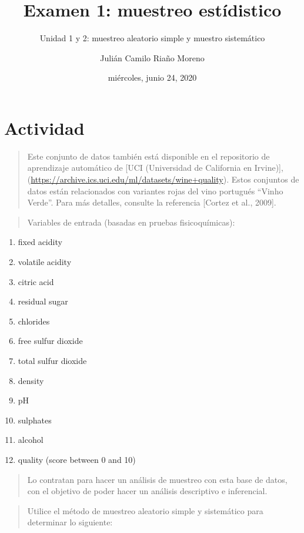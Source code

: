 \documentclass[
]{article}
\title{Examen 1: muestreo estídistico}
\subtitle{Unidad 1 y 2: muestreo aleatorio simple y muestro sistemático}
\author{Julián Camilo Riaño Moreno}
\date{miércoles, junio 24, 2020}
\providecommand{\tightlist}{%
  \setlength{\itemsep}{0pt}\setlength{\parskip}{0pt}}
\begin{document}
\maketitle

{
\setcounter{tocdepth}{3}
\tableofcontents
}
\hypertarget{actividad}{%
\section{Actividad}\label{actividad}}

\begin{quote}
Este conjunto de datos también está disponible en el repositorio de
aprendizaje automático de {[}UCI (Universidad de California en
Irvine){]},
(\url{https://archive.ics.uci.edu/ml/datasets/wine+quality}). Estos
conjuntos de datos están relacionados con variantes rojas del vino
portugués ``Vinho Verde''. Para más detalles, consulte la referencia
{[}Cortez et al., 2009{]}.
\end{quote}

\begin{quote}
Variables de entrada (basadas en pruebas fisicoquímicas):
\end{quote}

\begin{enumerate}
\def\labelenumi{\arabic{enumi}.}
\tightlist
\item
  fixed acidity
\item
  volatile acidity
\item
  citric acid
\item
  residual sugar
\item
  chlorides
\item
  free sulfur dioxide
\item
  total sulfur dioxide
\item
  density
\item
  pH
\item
  sulphates
\item
  alcohol
\item
  quality (score between 0 and 10)
\end{enumerate}

\begin{quote}
Lo contratan para hacer un análisis de muestreo con esta base de datos,
con el objetivo de poder hacer un análisis descriptivo e inferencial.
\end{quote}

\begin{quote}
Utilice el método de muestreo aleatorio simple y sistemático para
determinar lo siguiente:
\end{quote}
\end{document}

